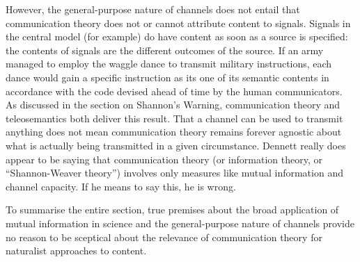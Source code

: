 However, the general-purpose nature of channels does not entail that communication theory does not or cannot attribute content to signals.
Signals in the central model (for example) do have content as soon as a source is specified: the contents of signals are the different outcomes of the source.
If an army managed to employ the waggle dance to transmit military instructions, each dance would gain a specific instruction as its one of its semantic contents in accordance with the code devised ahead of time by the human communicators.
As discussed in the section on Shannon's Warning, communication theory and teleosemantics both deliver this result.
That a channel can be used to transmit anything does not mean communication theory remains forever agnostic about what is actually being transmitted in a given circumstance.
Dennett really does appear to be saying that communication theory (or information theory, or ``Shannon-Weaver theory'') involves only measures like mutual information and channel capacity.
If he means to say this, he is wrong.

To summarise the entire section, true premises about the broad application of mutual information in science and the general-purpose nature of channels provide no reason to be sceptical about the relevance of communication theory for naturalist approaches to content.
